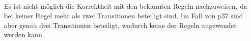 \documentclass[10pt,a4paper,oneside,ngerman,numbers=noenddot]{scrartcl}
\begin{document}
\subsection{}
Es ist nicht möglich die Korrektheit mit den bekannten Regeln nachzuweisen, da bei keiner Regel mehr als zwei Transitionen beteiligt sind. Im Fall von p37 sind aber genau drei Transitionen beteiligt, wodurch keine der Regeln angewendet werden kann.
\section{} %
\end{document}
